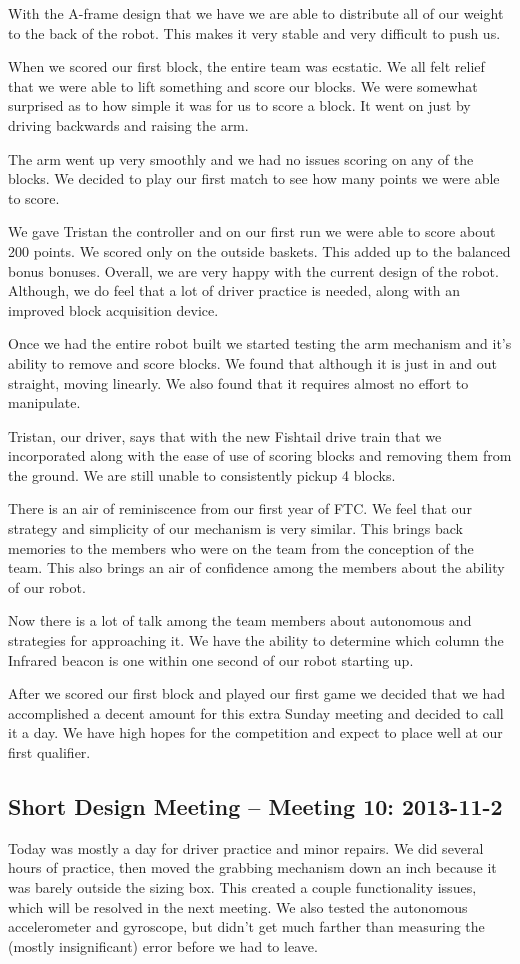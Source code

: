 With the A-frame design that we have we are able to distribute all of our weight to the back of the robot. This makes it very stable and very difficult to push us. 

When we scored our first block, the entire team was ecstatic. We all felt relief that we were able to lift something and score our blocks. We were somewhat surprised as to how simple it was for us to score a block. It went on just by driving backwards and raising the arm.

The arm went up very smoothly and we had no issues scoring on any of the blocks. We decided to play our first match to see how many points we were able to score.

We gave Tristan the controller and on our first run we were able to score about 200 points. We scored only on the outside baskets. This added up to the balanced bonus bonuses. Overall, we are very happy with the current design of the robot. Although, we do feel that a lot of driver practice is needed, along with an improved block acquisition device. 

Once we had the entire robot built we started testing the arm mechanism and it's ability to remove and score blocks. We found that although it is just in and out straight, moving linearly. We also found that it requires almost no effort to manipulate.

Tristan, our driver, says that with the new Fishtail drive train that we incorporated along with the ease of use of scoring blocks and removing them from the ground. We are still unable to consistently pickup 4 blocks. 

There is an air of reminiscence from our first year of FTC. We feel that our strategy and simplicity of our mechanism is very similar. This brings back memories to the members who were on the team from the conception of the team. This also brings an air of confidence among the members about the ability of our robot.

Now there is a lot of talk among the team members about autonomous and strategies for approaching it. We have the ability to determine which column the Infrared beacon is one within one second of our robot starting up.

After we scored our first block and played our first game we decided that we had accomplished a decent amount for this extra Sunday meeting and decided to call it a day. We have high hopes for the competition and expect to place well at our first qualifier. 

\newpage \subsection{Short Design Meeting -- Meeting 10: 2013-11-2}
Today was mostly a day for driver practice and minor repairs. We did several hours of practice, then moved the grabbing mechanism down an inch because it was barely outside the sizing box. This created a couple functionality issues, which will be resolved in the next meeting. We also tested the autonomous accelerometer and gyroscope, but didn't get much farther than measuring the (mostly insignificant) error before we had to leave. 

